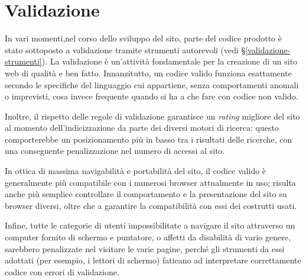 \section{Validazione}
\label{validazione}
In vari momenti,nel corso dello sviluppo del sito, parte del codice prodotto è stato sottoposto a validazione tramite strumenti autorevoli (vedi §\ref{validazione-strumenti}). La validazione è un'attività fondamentale per la creazione di un sito web di qualità e ben fatto. Innanzitutto, un codice valido funziona esattamente secondo le specifiche del linguaggio cui appartiene, senza comportamenti anomali o imprevisti, cosa invece frequente  quando si ha a che fare con codice non valido. 

Inoltre, il rispetto delle regole di validazione garantisce un \textit{rating} migliore del sito al momento dell'indicizzazione da parte dei diversi motori di ricerca: questo comporterebbe un posizionamento più in basso tra i risultati delle ricerche, con una conseguente penalizzazione nel numero di accessi al sito.

In ottica di massima navigabilità e portabilità del sito, il codice valido è generalmente più compatibile con i numerosi browser attualmente in uso; risulta anche più semplice controllare il comportamento e la presentazione del sito su browser diversi, oltre che a garantire la compatibilità con essi dei costrutti usati.

Infine, tutte le categorie di utenti impossibilitate a navigare il sito attraverso un computer fornito di schermo e puntatore, o affetti da disabilità di vario genere, sarebbero penalizzate nel visitare le varie pagine, perché gli strumenti da essi adottati (per esempio, i lettori di schermo) faticano ad interpretare correttamente codice con errori di validazione.




